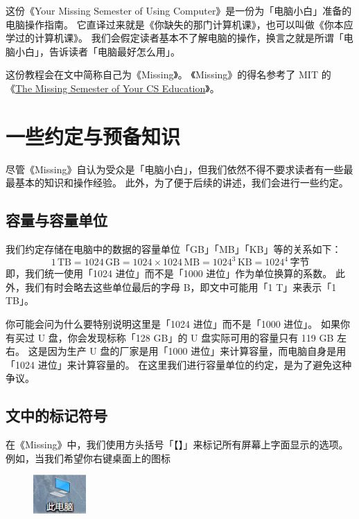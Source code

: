 \documentclass[a4paper]{book}
\begin{document}
这份《Your Missing Semester of Using Computer》是一份为「电脑小白」准备的电脑操作指南。
它直译过来就是《你缺失的那门计算机课》，也可以叫做《你本应学过的计算机课》。
我们会假定读者基本不了解电脑的操作，换言之就是所谓「电脑小白」，告诉读者「电脑最好怎么用」。

这份教程会在文中简称自己为《Missing》。
《Missing》的得名参考了 MIT 的《\href{https://missing.csail.mit.edu/}{The Missing Semester of Your CS Education}》。

\mainmatter

\setcounter{chapter}{-1}

\chapter{一些约定与预备知识}

尽管《Missing》自认为受众是「电脑小白」，但我们依然不得不要求读者有一些最最基本的知识和操作经验。
此外，为了便于后续的讲述，我们会进行一些约定。

\section{容量与容量单位}

我们约定存储在电脑中的数据的容量单位「GB」「MB」「KB」等的关系如下：
\[1\,\mathrm{TB}=1024\,\mathrm{GB}=1024\times1024\,\mathrm{MB}=1024^3\,\mathrm{KB}=1024^4\,\text{字节}\]
即，我们统一使用「1024 进位」而不是「1000 进位」作为单位换算的系数。
此外，我们有时会略去这些单位最后的字母 B，即文中可能用「1 T」来表示「1 TB」。

你可能会问为什么要特别说明这里是「1024 进位」而不是「1000 进位」。
如果你有买过 U 盘，你会发现标称「128 GB」的 U 盘实际可用的容量只有 119 GB 左右。
这是因为生产 U 盘的厂家是用「1000 进位」来计算容量，而电脑自身是用「1024 进位」来计算容量的。
在这里我们进行容量单位的约定，是为了避免这种争议。

\section{文中的标记符号}

在《Missing》中，我们使用方头括号「【】」来标记所有屏幕上字面显示的选项。
例如，当我们希望你右键桌面上的图标
\begin{figure}[htb!]
  \centering
  \includegraphics[width=2cm]{src/This_PC.png}
\end{figure}
\end{document}

